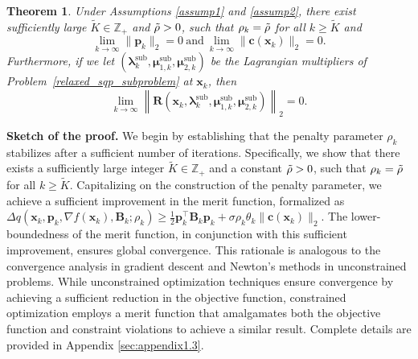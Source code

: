 \documentclass[aos]{imsart}
\numberwithin{equation}{section}
\theoremstyle{plain}
\newtheorem{theorem}{Theorem}
\begin{document}
\begin{theorem}
\label{theorem_det_sqp}
Under Assumptions \ref{assump1} and \ref{assump2}, there exist sufficiently large $\widetilde{K} \in \mathbb{Z}_{+}$ and $\Tilde{\rho}>0$, such that $\rho_k = \Tilde{\rho}$ for all $k \geq \widetilde{K}$ and 
\begin{equation}
\label{eq4}
    \lim_{k \to \infty} \|\bm{p}_k\|_2 = 0~\text{and}~ \lim_{k \to \infty} \|\bm{c}(\bm{x}_k)\|_2 = 0.
\end{equation}
Furthermore, if we let $(\bm{\lambda}_k^{\text{sub}}, \bm{\mu}_{1,k}^{\text{sub}},\bm{\mu}_{2,k}^{\text{sub}})$ be the Lagrangian multipliers of Problem~\eqref{relaxed_sqp_subproblem} at $\bm{x}_k$, then 
\begin{equation}
\label{eq5}
    \lim_{k \to \infty} \left\| \bm{R}(\bm{x}_k, \bm{\lambda}_k^{\text{sub}}, \bm{\mu}_{1,k}^{\text{sub}}, \bm{\mu}_{2,k}^{\text{sub}}) \right\|_2 = 0.
\end{equation}
\end{theorem}


\textbf{Sketch of the proof.} We begin by establishing that the penalty parameter $\rho_k$ stabilizes after a sufficient number of iterations. Specifically, we show that there exists a sufficiently large integer $\widetilde{K} \in \mathbb{Z}_{+}$ and a constant $\Tilde{\rho} > 0$, such that $\rho_k = \Tilde{\rho}$ for all $k \geq \widetilde{K}$.
Capitalizing on the construction of the penalty parameter, we achieve a sufficient improvement in the merit function, formalized as $\Delta q(\bm{x}_k,\bm{p}_k,\nabla f(\bm{x}_k),\bm{B}_k;\rho_k) \geq \frac{1}{2} \bm{p}_k^{\top} \bm{B}_k \bm{p}_k + \sigma \rho_k \theta_k \|\bm{c}(\bm{x}_k)\|_2$. The lower-boundedness of the merit function, in conjunction with this sufficient improvement, ensures global convergence. This rationale is analogous to the convergence analysis in gradient descent and Newton's methods in unconstrained problems. 
While unconstrained optimization techniques ensure convergence by achieving a sufficient reduction in the objective function, constrained optimization employs a merit function that amalgamates both the objective function and constraint violations to achieve a similar result. Complete details are provided in Appendix \ref{sec:appendix1.3}.
\end{document}
